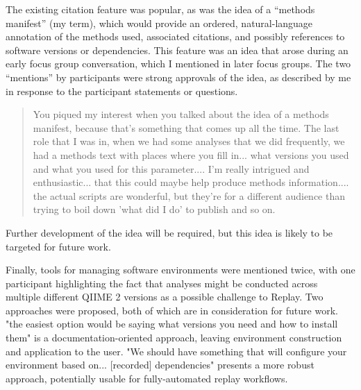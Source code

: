 The existing citation feature was popular, as was the idea of a “methods
manifest” (my term), which would provide an ordered, natural-language annotation
of the methods used, associated citations, and possibly references to software
versions or dependencies. This feature was an idea that arose during an early
focus group conversation, which I mentioned in later focus groups. The two
“mentions” by participants were strong approvals of the idea, as described by me
in response to the participant statements or questions.

\begin{quote}
You piqued my interest when you talked about the idea of a methods manifest,
because that's something that comes up all the time. The last role that I was
in, when we had some analyses that we did frequently, we had a methods text with
places where you fill in... what versions you used and what you used for this
parameter.... I'm really intrigued and enthusiastic... that this could maybe
help produce methods information.... the actual scripts are wonderful, but
they're for a different audience than trying to boil down 'what did I do' to
publish and so on.
\end{quote}

\noindent Further development of the idea will be required, but this idea is likely to be
targeted for future work.

Finally, tools for managing software environments were mentioned twice, with one
participant highlighting the fact that analyses might be conducted across
multiple different QIIME 2 versions as a possible challenge to Replay. Two
approaches were proposed, both of which are in consideration for future work.
"the easiest option would be saying what versions you need and how to install
them" is a documentation-oriented approach, leaving environment construction and
application to the user. "We should have something that will configure your
environment based on... [recorded] dependencies" presents a more robust
approach, potentially usable for fully-automated replay workflows.
